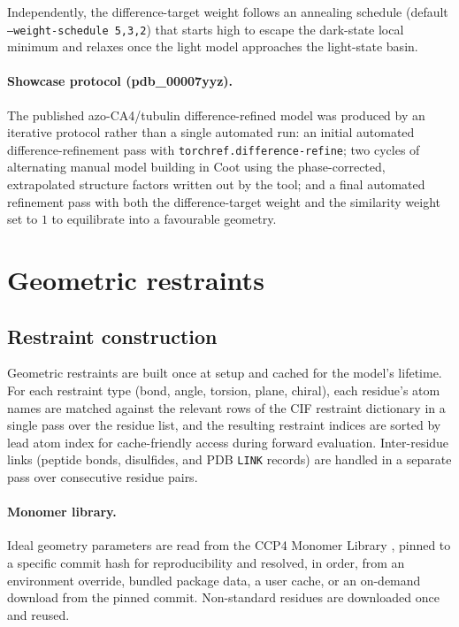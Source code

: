 \documentclass{iucrjournals}
\begin{document}
Independently, the difference-target weight follows an annealing schedule
(default \texttt{--weight-schedule\ 5,3,2}) that starts high to escape the
dark-state local minimum and relaxes once the light model approaches the
light-state basin.

\paragraph{Showcase protocol (pdb\_00007yyz).}
The published azo-CA4/tubulin difference-refined model
\cite{wranik_watching_2023} was produced by an iterative protocol rather
than a single automated run: an initial automated difference-refinement
pass with \texttt{torchref.difference-refine}; two cycles of alternating
manual model building in Coot using the phase-corrected, extrapolated
structure factors written out by the tool; and a final automated
refinement pass with both the difference-target weight and the similarity
weight set to $1$ to equilibrate into a favourable geometry.


\section{Geometric restraints}

\subsection{Restraint construction}

Geometric restraints are built once at setup and cached for the model's
lifetime.  For each restraint type (bond, angle, torsion, plane, chiral),
each residue's atom names are matched against the relevant rows of the CIF
restraint dictionary in a single pass over the residue list, and the
resulting restraint indices are sorted by lead atom index for cache-friendly
access during forward evaluation.  Inter-residue links (peptide bonds,
disulfides, and PDB \texttt{LINK} records) are handled in a separate pass
over consecutive residue pairs.
%
\paragraph{Monomer library.}
Ideal geometry parameters are read from the CCP4 Monomer Library
\cite{long_acedrg_2017}, pinned to a specific commit hash for
reproducibility and resolved, in order, from an environment override,
bundled package data, a user cache, or an on-demand download from the pinned
commit.  Non-standard residues are downloaded once and reused.
\end{document}
